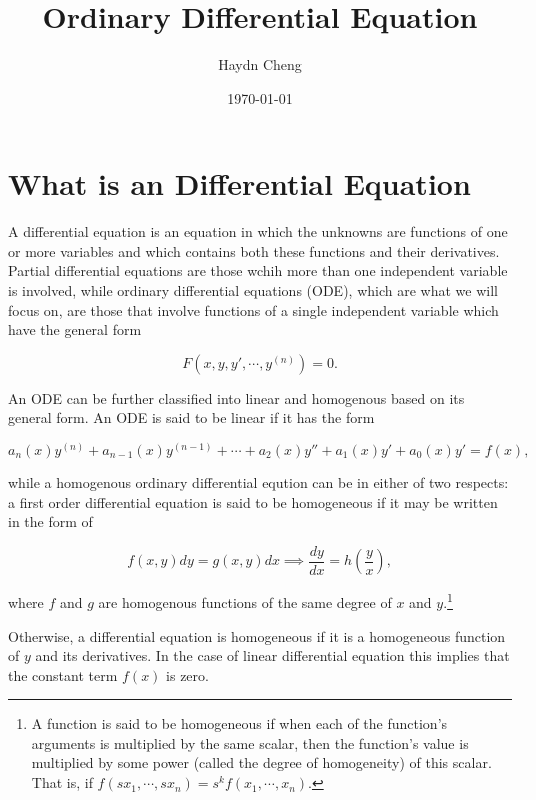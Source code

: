 \documentclass[english,a4paper,12pt]{report}
\title{Ordinary Differential Equation}
\author{Haydn Cheng}
\date{\today}
\begin{document}
\maketitle
\tableofcontents

    
\chapter{What is an Differential Equation}

A differential equation is an equation in which the unknowns are functions of one or more variables and which contains both these functions and their derivatives. Partial differential equations are those wchih more than one independent variable is involved, while ordinary differential equations (ODE), which are what we will focus on, are those that involve functions of a single independent variable which have the general form

\begin{equation}
    F(x,y,y',\cdots ,y^{(n)} ) = 0.
\end{equation}

An ODE can be further classified into linear and homogenous based on its general form. An ODE is said to be linear if it has the form

\begin{equation}
    a_{n}(x)y^{(n)} + a_{n-1}(x)y^{(n-1)} + \cdots + a_{2}(x)y''+a_{1}(x)y'+a_0 (x)y' = f(x) ,     
\end{equation}

while a homogenous ordinary differential eqution can be in either of two respects: a first order differential equation is said to be homogeneous if it may be written in the form of

\begin{equation} \label{firstorderhomo} 
    f(x,y)dy=g(x,y)dx \implies \frac{dy}{dx} = h\left(\frac{y}{x} \right), 
\end{equation}


where \(f\) and \(g\) are homogenous functions of the same degree of \(x\) and \(y\).\footnote{A function is said to be homogeneous if when each of the function's arguments is multiplied by the same scalar, then the function's value is multiplied by some power (called the degree of homogeneity) of this scalar. That is, if \(f(sx_1 ,\cdots, sx_{n} ) = s ^{k} f(x_1 ,\cdots,x_{n} )  \).  }

Otherwise, a differential equation is homogeneous if it is a homogeneous function of \(y\)  and its derivatives. In the case of linear differential equation this implies that the constant term \(f(x)\)  is zero.
\end{document}
